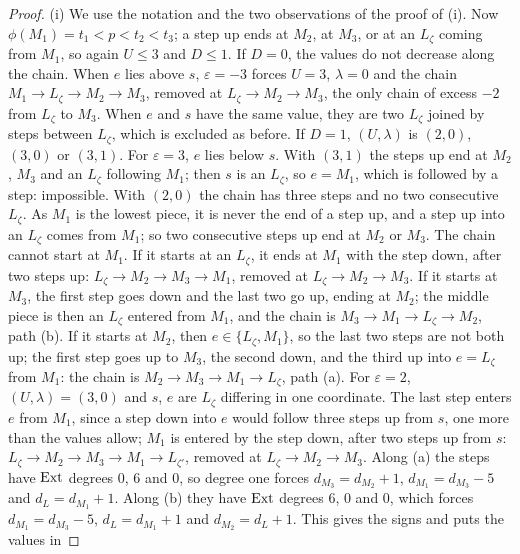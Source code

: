 \begin{proof}
(i) We use the notation and the two observations of the proof of
(i). Now $\phi(M_{1})=t_{1}<p<t_{2}<t_{3}$; a step up
ends at $M_{2}$, at $M_{3}$, or at an $L_{\zeta}$ coming from $M_{1}$, so
again $U\le3$ and $D\le1$. If $D=0$, the values do not decrease along the
chain. When $e$ lies above $s$, $\varepsilon=-3$ forces $U=3$, $\lambda=0$
and the chain $M_{1}\to L_{\zeta}\to M_{2}\to M_{3}$, removed at
$L_{\zeta}\to M_{2}\to M_{3}$, the only chain of excess $-2$ from
$L_{\zeta}$ to $M_{3}$. When $e$ and $s$ have the same value, they are two
$L_{\zeta}$ joined by steps between $L_{\zeta}$, which is excluded as before.
If $D=1$, $(U,\lambda)$ is $(2,0)$, $(3,0)$ or $(3,1)$. For
$\varepsilon=3$, $e$ lies below $s$. With $(3,1)$ the steps up end at
$M_{2}$, $M_{3}$ and an $L_{\zeta}$ following $M_{1}$; then $s$ is an
$L_{\zeta}$, so $e=M_{1}$, which is followed by a step: impossible. With
$(2,0)$ the chain has three steps and no two consecutive $L_{\zeta}$. As
$M_{1}$ is the lowest piece, it is never the end of a step up, and a step up
into an $L_{\zeta}$ comes from $M_{1}$; so two consecutive steps up end at
$M_{2}$ or $M_{3}$. The chain cannot start at $M_{1}$. If it starts at an
$L_{\zeta}$, it ends at $M_{1}$ with the step down, after two steps up:
$L_{\zeta}\to M_{2}\to M_{3}\to M_{1}$, removed at $L_{\zeta}\to M_{2}\to
M_{3}$. If it starts at $M_{3}$, the first step goes down and the last two
go up, ending at $M_{2}$; the middle piece is then an $L_{\zeta}$ entered
from $M_{1}$, and the chain is $M_{3}\to M_{1}\to L_{\zeta}\to M_{2}$, path
(b). If it starts at $M_{2}$, then $e\in\{L_{\zeta},M_{1}\}$, so the last two
steps are not both up; the first step goes up to $M_{3}$, the second down,
and the third up into $e=L_{\zeta}$ from $M_{1}$: the chain is $M_{2}\to
M_{3}\to M_{1}\to L_{\zeta}$, path (a). For $\varepsilon=2$,
$(U,\lambda)=(3,0)$ and $s$, $e$ are $L_{\zeta}$ differing in one
coordinate. The last step enters $e$ from $M_{1}$, since a step down into
$e$ would follow three steps up from $s$, one more than the values allow;
$M_{1}$ is entered by the step down, after two steps up from $s$:
$L_{\zeta}\to M_{2}\to M_{3}\to M_{1}\to L_{\zeta'}$, removed at
$L_{\zeta}\to M_{2}\to M_{3}$.
Along (a) the steps have $\operatorname{Ext}$ degrees $0$, $6$ and $0$, so degree one
forces $d_{M_{3}}=d_{M_{2}}+1$, $d_{M_{1}}=d_{M_{3}}-5$ and
$d_{L}=d_{M_{1}}+1$. Along (b) they have $\operatorname{Ext}$ degrees $6$, $0$ and $0$,
which forces $d_{M_{1}}=d_{M_{3}}-5$, $d_{L}=d_{M_{1}}+1$ and
$d_{M_{2}}=d_{L}+1$. This gives the signs and puts the values in

\end{proof}
